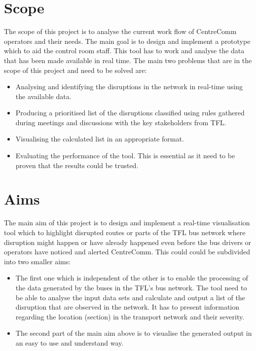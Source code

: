 \section{Scope}
The scope of this project is to analyse the current work flow of CentreComm operators and their needs. The main goal is to design and implement a prototype which to aid the control room staff. This tool has to work and analyse the data that has been made available in real time. The main two problems that are in the scope of this project and need to be solved are:
\begin{itemize}
	\item Analysing and identifying the disruptions in the network in real-time using the available data.
	\item Producing a prioritised list of the disruptions classified using rules gathered during meetings and discussions with the key stakeholders from TFL.
	\item Visualising the calculated list in an appropriate format.
	\item Evaluating the performance of the tool. This is essential as it need to be proven that the results could be trusted.
\end{itemize} 

\section{Aims}
The main aim of this project is to design and implement a real-time visualisation tool which to highlight disrupted routes or parts of the TFL bus network where disruption might happen or have already happened even before the bus drivers or operators have noticed and alerted CentreComm. This could could be subdivided into two smaller aims:
\begin{itemize}
	\item The first one which is independent of the other is to enable the processing of the data generated by the buses in the TFL's bus network. The tool need to be able to analyse the input data sets and calculate and output a list of the disruption that are observed in the network. It has to present information regarding the location (section) in the transport network and their severity.
	\item The second part of the main aim above is to visualise the generated output in an easy to use and understand way.
\end{itemize}

